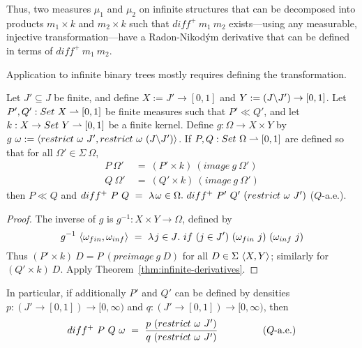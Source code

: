 Thus, two measures $\mu_1$ and $\mu_2$ on infinite structures that can be decomposed into products $m_1 \times k$ and $m_2 \times k$ such that $diff^+~m_1~m_2$ exists---using any measurable, injective transformation---have a Radon-Nikod\'ym derivative that can be defined in terms of $diff^+~m_1~m_2$.

Application to infinite binary trees mostly requires defining the transformation.

\begin{theorem}
\label{thm:infinite-radon-nikodym}
Let $J' \subseteq J$ be finite, and define $X := J' \to [0,1]$ and $Y := (J \backslash J') \to [0,1]$.
Let $P',Q' : Set~X \rightharpoonup [0,1]$ be finite measures such that $P' \ll Q'$, and let $k : X \to Set~Y \rightharpoonup [0,1]$ be a finite kernel.
Define $g : \Omega \to X \times Y$ by $g~\omega := \langle{restrict~\omega~J',restrict~\omega~(J \backslash J')}\rangle$.
If $P,Q : Set~\Omega \rightharpoonup [0,1]$ are defined so that for all $\Omega' \in \Sigma~\Omega$,
\begin{equation}
\begin{aligned}
	P~\Omega'&\ =\ (P' \times k)~(image~g~\Omega') \\
	Q~\Omega'&\ =\ (Q' \times k)~(image~g~\Omega')
\end{aligned}
\end{equation}
then $P \ll Q$ and $diff^+~P~Q\ =\ \lambda\mspace{2mu}{\omega \in \Omega}\ldotp\, diff^+~P'~Q'~(restrict~\omega~J')$ ($Q$-a.e.).
\end{theorem}
\begin{proof}
The inverse of $g$ is $g^{-1} : X \times Y \to \Omega$, defined by
\begin{equation}
	g^{-1}~\pair{\omega_{fin},\omega_{inf}}\ =\ \fun{j \in J} if~(j \in J')~(\omega_{fin}~j)~(\omega_{inf}~j)
\end{equation}
Thus $(P' \times k)~D = P~(preimage~g~D)$ for all $D \in \Sigma~\langle{X,Y}\rangle$; similarly for $(Q' \times k)~D$.
Apply Theorem~\ref{thm:infinite-derivatives}.
\end{proof}

In particular, if additionally $P'$ and $Q'$ can be defined by densities $p : (J' \to [0,1]) \to [0,\infty)$ and $q : (J' \to [0,1]) \to [0,\infty)$, then
\begin{equation}
\begin{aligned}
	diff^+~P~Q~\omega\ =\ \frac{p~(restrict~\omega~J')}{q~(restrict~\omega~J')}
		\hspace{0.5in} &&\text{($Q$-a.e.)}
\end{aligned}
\end{equation}

